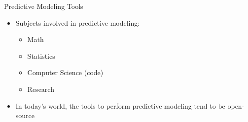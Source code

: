\documentclass[10pt]{beamer}
\begin{document}
\begin{frame}[t]{Predictive Modeling Tools}
  \begin{itemize}
    \item Subjects involved in predictive modeling:
    \begin{itemize}
      \item Math
      \item Statistics
      \item Computer Science (code)
      \item Research
    \end{itemize}
    \item In today's world, the tools to perform predictive modeling tend to be
      open-source
  \end{itemize}
\end{frame}
\end{document}
